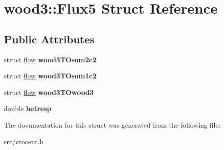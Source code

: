 \hypertarget{structwood3_1_1_flux5}{\section{wood3\-:\-:Flux5 Struct Reference}
\label{structwood3_1_1_flux5}
}
\subsection*{Public Attributes}
\begin{DoxyCompactItemize}
\item 
\hypertarget{structwood3_1_1_flux5_a1917f60dd2bf0294e45df200f25d7e8e}{struct \hyperlink{structflow}{flow} {\bfseries wood3\-T\-Osom2c2}}\label{structwood3_1_1_flux5_a1917f60dd2bf0294e45df200f25d7e8e}

\item 
\hypertarget{structwood3_1_1_flux5_a2cfe23bc9a4672163e8a0dea40017070}{struct \hyperlink{structflow}{flow} {\bfseries wood3\-T\-Osom1c2}}\label{structwood3_1_1_flux5_a2cfe23bc9a4672163e8a0dea40017070}

\item 
\hypertarget{structwood3_1_1_flux5_a9fa644a087117e41603c929475d6daae}{struct \hyperlink{structflow}{flow} {\bfseries wood3\-T\-Owood3}}\label{structwood3_1_1_flux5_a9fa644a087117e41603c929475d6daae}

\item 
\hypertarget{structwood3_1_1_flux5_a777bfd23a7d5176c51d26d4968d2424d}{double {\bfseries hetresp}}\label{structwood3_1_1_flux5_a777bfd23a7d5176c51d26d4968d2424d}

\end{DoxyCompactItemize}


The documentation for this struct was generated from the following file\-:\begin{DoxyCompactItemize}
\item 
src/crocent.\-h\end{DoxyCompactItemize}
